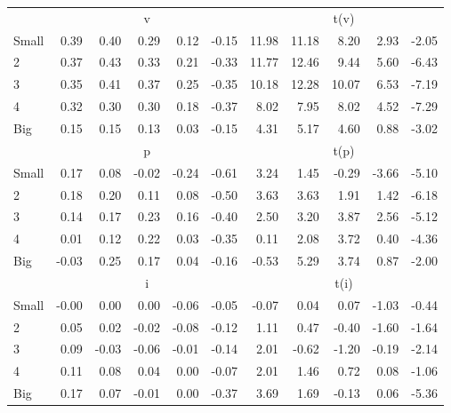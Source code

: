 \begin{table}[!ht]
\begin{tabular}{lrrrrrrrrrr}
  
     & \multicolumn{5}{c}{v} & \multicolumn{5}{c}{t(v)}   \\
     \cmidrule(r){2-6} \cmidrule(r){7-11} 
    Small  & 0.39  & 0.40  & 0.29  & 0.12  & -0.15  & 11.98  & 11.18  & 8.20  & 2.93  & -2.05   \\
    2  & 0.37  & 0.43  & 0.33  & 0.21  & -0.33  & 11.77  & 12.46  & 9.44  & 5.60  & -6.43   \\
    3  & 0.35  & 0.41  & 0.37  & 0.25  & -0.35  & 10.18  & 12.28  & 10.07  & 6.53  & -7.19   \\
    4  & 0.32  & 0.30  & 0.30  & 0.18  & -0.37  & 8.02  & 7.95  & 8.02  & 4.52  & -7.29   \\
    Big  & 0.15  & 0.15  & 0.13  & 0.03  & -0.15  & 4.31  & 5.17  & 4.60  & 0.88  & -3.02   \\
    
  
     & \multicolumn{5}{c}{p} & \multicolumn{5}{c}{t(p)}   \\
     \cmidrule(r){2-6} \cmidrule(r){7-11} 
    Small  & 0.17  & 0.08  & -0.02  & -0.24  & -0.61  & 3.24  & 1.45  & -0.29  & -3.66  & -5.10   \\
    2  & 0.18  & 0.20  & 0.11  & 0.08  & -0.50  & 3.63  & 3.63  & 1.91  & 1.42  & -6.18   \\
    3  & 0.14  & 0.17  & 0.23  & 0.16  & -0.40  & 2.50  & 3.20  & 3.87  & 2.56  & -5.12   \\
    4  & 0.01  & 0.12  & 0.22  & 0.03  & -0.35  & 0.11  & 2.08  & 3.72  & 0.40  & -4.36   \\
    Big  & -0.03  & 0.25  & 0.17  & 0.04  & -0.16  & -0.53  & 5.29  & 3.74  & 0.87  & -2.00   \\
    
  
     & \multicolumn{5}{c}{i} & \multicolumn{5}{c}{t(i)}   \\
     \cmidrule(r){2-6} \cmidrule(r){7-11} 
    Small  & -0.00  & 0.00  & 0.00  & -0.06  & -0.05  & -0.07  & 0.04  & 0.07  & -1.03  & -0.44   \\
    2  & 0.05  & 0.02  & -0.02  & -0.08  & -0.12  & 1.11  & 0.47  & -0.40  & -1.60  & -1.64   \\
    3  & 0.09  & -0.03  & -0.06  & -0.01  & -0.14  & 2.01  & -0.62  & -1.20  & -0.19  & -2.14   \\
    4  & 0.11  & 0.08  & 0.04  & 0.00  & -0.07  & 2.01  & 1.46  & 0.72  & 0.08  & -1.06   \\
    Big  & 0.17  & 0.07  & -0.01  & 0.00  & -0.37  & 3.69  & 1.69  & -0.13  & 0.06  & -5.36   \\
    

\end{tabular}
\end{table}
